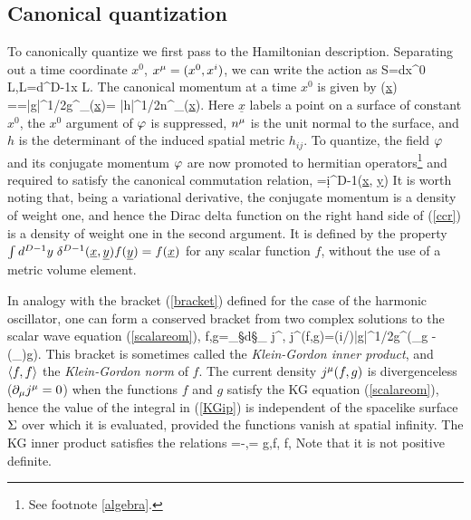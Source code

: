 \documentclass[12pt]{article}
\begin{document}
\subsection{Canonical quantization}
To canonically quantize we first pass to the Hamiltonian
description. Separating out a time coordinate $x^0$,
$x^\m=(x^0,x^i)$, we can write the action as
%
\beq S=\int dx^0\; L,\qquad\qquad L=\int d^{D-1}x\; {\cal L}. \eeq
%
The canonical momentum at a time $x^0$ is given by
%
\beq \pi(\underline{x}) ==|g|^{1/2}g^{}\p_\m\fphi(\underline{x})=
|h|^{1/2}n^{\m}\p_\m\fphi(\underline{x}).\label{momentum} \eeq
%
Here $\underline{x}$ labels a point on a surface of constant
$x^0$, the $x^0$ argument of $\fphi$ is suppressed, $n^\m$ is the
unit normal to the surface, and $h$ is the determinant of 
the induced spatial metric $h_{ij}$. To quantize, the
field $\fphi$ and its conjugate momentum $\fphi$ are now promoted
to hermitian operators\footnote{See footnote \ref{algebra}.}
and required to satisfy the canonical commutation relation,
%
=i\hbar\d^{D-1}(\underline{x}, \underline{y})
\label{ccr} \eeq
%
It is worth noting that, being a variational derivative, the
conjugate momentum is a density of weight one, and hence the
Dirac delta function on the right hand side of (\ref{ccr}) is
a density of weight one in the second argument. It is 
defined by the property 
$\int d^{D-1}y\; \d^{D-1}(\underline{x}, \underline{y}) f(\underline{y})=f(\underline{x})$
for any scalar function $f$, without the use of a metric volume element.

In analogy with the bracket (\ref{bracket}) defined for the case
of the harmonic oscillator, one can form a conserved bracket
from two complex solutions to the scalar wave equation
(\ref{scalareom}),
%
\beq \la f,g\ra=\int_\S d\S_\m\; j^\m, \qquad\qquad
j^\m(f,g)=(i/\hbar)|g|^{1/2}g^{\m\n}\Bigl(\p_\n g -
(\p_\n {})g\Bigr).\label{KGip}\eeq
%
This bracket is sometimes called the {\it Klein-Gordon inner product}, and $\la f,f\ra$ the {\it Klein-Gordon norm} of $f$.
The current density $j^\m(f,g)$ is divergenceless ($\p_\m j^\m=0$)
when the functions $f$ and $g$ satisfy the KG equation
(\ref{scalareom}), hence
the value of the integral in (\ref{KGip}) is independent of the
spacelike surface $\S$ over which it is evaluated, provided the
functions vanish at spatial infinity. The KG inner
product satisfies the relations
%
\beq {}=-\la {},\ra = \la g,f\ra,
\qquad\qquad \la f, \label{bracketrelns}\eeq
%
Note that it is not positive definite.
\end{document}
